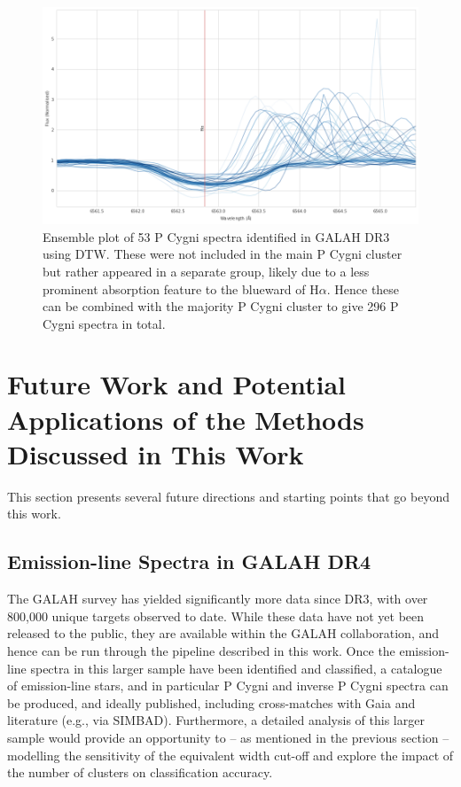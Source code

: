\begin{figure}[!htb]
\centering
\includegraphics[scale=0.45]{figures/p cugni 2.png}
\caption{Ensemble plot of 53 P Cygni spectra identified in GALAH DR3 using DTW. These were not included in the main P Cygni cluster but rather appeared in a separate group, likely due to a less prominent absorption feature to the blueward of H$\alpha$. Hence these can be combined with the majority P Cygni cluster to give 296 P Cygni spectra in total.}
\end{figure}





\section{Future Work and Potential Applications of the Methods Discussed in This Work}

This section presents several future directions and starting points that go beyond this work. 

\subsection{Emission-line Spectra in GALAH DR4}

The GALAH survey has yielded significantly more data since DR3, with over 800,000 unique targets observed to date. While these data have not yet been released to the public, they are available within the GALAH collaboration, and hence can be run through the pipeline described in this work. Once the emission-line spectra in this larger sample have been identified and classified, a catalogue of emission-line stars, and in particular P Cygni and inverse P Cygni spectra can be produced, and ideally published, including cross-matches with Gaia and literature (e.g., via SIMBAD). Furthermore, a detailed analysis of this larger sample would provide an opportunity to -- as mentioned in the previous section -- modelling the sensitivity of the equivalent width cut-off and explore the impact of the number of clusters on classification accuracy.

